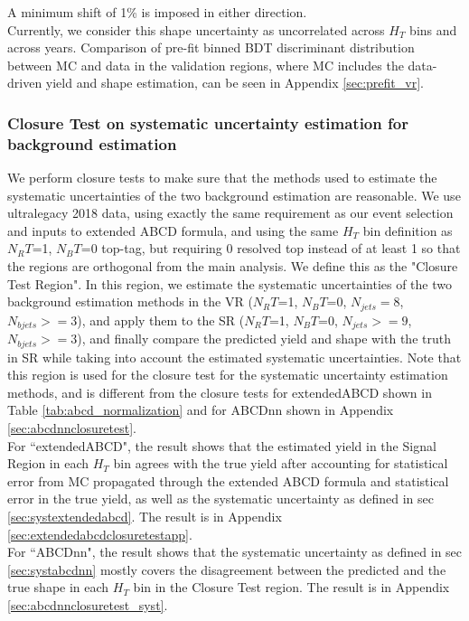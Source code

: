 \documentclass[twoside]{article}
\begin{document}
A minimum shift of 1\% is imposed in either direction.\\

Currently, we consider this shape uncertainty as uncorrelated across $H_T$ bins and across years. Comparison of pre-fit binned BDT discriminant distribution between MC and data in the validation regions, where MC includes the data-driven yield and shape estimation, can be seen in Appendix \ref{sec:prefit_vr}.



\subsubsection{Closure Test on systematic uncertainty estimation for background estimation}

We perform closure tests to make sure that the methods used to estimate the systematic uncertainties of the two background estimation are reasonable. We use ultralegacy 2018 data, using exactly the same requirement as our event selection and inputs to extended ABCD formula, and using the same $H_T$ bin definition as $N_RT$=1, $N_BT$=0 top-tag, but requiring 0 resolved top instead of at least 1 so that the regions are orthogonal from the main analysis. We define this as the "Closure Test Region". In this region, we estimate the systematic uncertainties of the two background estimation methods in the VR ($N_RT$=1, $N_BT$=0, $N_{jets}=8$, $N_{bjets}>=3$), and apply them to the SR ($N_RT$=1, $N_BT$=0, $N_{jets}>=9$, $N_{bjets}>=3$), and finally compare the predicted yield and shape with the truth in SR while taking into account the estimated systematic uncertainties. Note that this region is used for the closure test for the systematic uncertainty estimation methods, and is different from the closure tests for extendedABCD shown in Table \ref{tab:abcd_normalization} and for ABCDnn shown in Appendix \ref{sec:abcdnnclosuretest}.\\

For ``extendedABCD", the result shows that the estimated yield in the Signal Region in each $H_T$ bin agrees with the true yield after accounting for statistical error from MC propagated through the extended ABCD formula and statistical error in the true yield, as well as the systematic uncertainty as defined in sec \ref{sec:systextendedabcd}. The result is in Appendix \ref{sec:extendedabcdclosuretestapp}.\\

For ``ABCDnn", the result shows that the systematic uncertainty as defined in sec \ref{sec:systabcdnn} mostly covers the disagreement between the predicted and the true shape in each $H_T$ bin in the Closure Test region. The result is in Appendix \ref{sec:abcdnnclosuretest_syst}.\\
\end{document}

